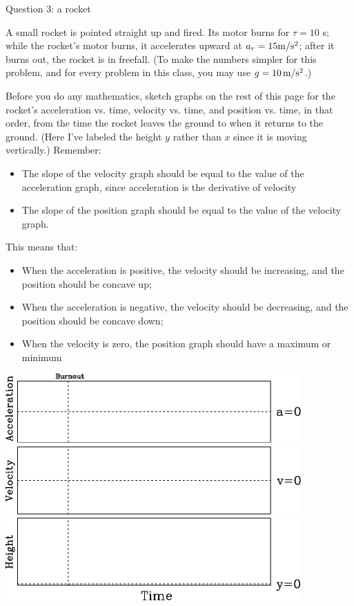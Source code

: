 \documentclass[12pt]{article}
\newcommand{\BI}{\begin{itemize}}
\newcommand{\EI}{\end{itemize}}
\begin{document}
\centerline{\Large Question 3: a rocket}
\begin{minipage}{0.3\textwidth}
A small rocket is pointed straight up and fired. Its motor burns for $\tau=10$ s; while the rocket's motor burns, it
accelerates upward at $a_r=15 \rm m/\rm s^2$; after it burns out, the rocket is in freefall. (To make the numbers simpler for 
this problem, and for every problem in this class, you may use $g=10\, \rm m/\rm s^2$.)


Before you do any mathematics, sketch graphs on the rest of this page for the rocket's acceleration vs. time, velocity vs. time, and position vs. time, in that order, from the time the rocket leaves the ground to when it returns to the ground. (Here I've labeled the height $y$ rather than $x$ since it is moving vertically.) Remember:

\BI
\item The slope of the velocity graph should be equal to the value of the acceleration graph, since acceleration is the derivative of velocity
\item The slope of the position graph should be equal to the value of the velocity graph.
\EI

This means that:

\BI
\item When the acceleration is positive, the velocity should be increasing, and the position should be concave up;
\item When the acceleration is negative, the velocity should be decreasing, and the position should be concave down;
\item When the velocity is zero, the position graph should have a maximum or minimum
\EI

\end{minipage}
\begin{minipage}{0.75\textwidth}
\begin{center}
\includegraphics[width=0.85\textwidth]{avst-plain-crop.pdf}\\
\includegraphics[width=0.85\textwidth]{vvst-plain-crop.pdf}\\
\includegraphics[width=0.85\textwidth]{xvst-plain-crop.pdf}
\end{center}
\end{minipage}
\end{document}

